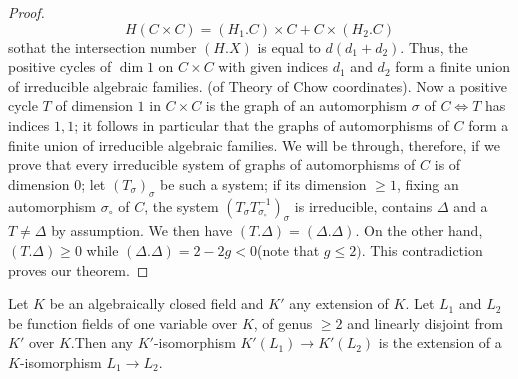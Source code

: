 \begin{proof}
  $$
  H(C \times C) = (H_1.C)\times C + C \times (H_2.C)
  $$
  so\pageoriginale that the intersection number $(H.X)$ is equal to $d(d_1 +
  d_2)$. Thus, the positive cycles of $\dim 1$  on $C \times C$ with
  given indices $d_1$ and $d_2$ form a finite union of irreducible
  algebraic families. (of Theory of  Chow coordinates). Now a positive
  cycle $T$ of dimension $1$ in $C \times C$ is the graph of an automorphism
  $\sigma$ of $C \Leftrightarrow T$ has indices $1,1$; it follows in
  particular that the graphs of automorphisms of $C$ form a finite
  union of irreducible algebraic families. We will be through,
  therefore, if we prove that every irreducible system of graphs of
  automorphisms of $C$ is of dimension $0$; let $(T_ \sigma)_\sigma$
  be such a system; if its dimension $\geq 1$, fixing an automorphism
  $\sigma_\circ$ of $C$, the system $(T_\sigma
  T_{\sigma_\circ}^{-1})_\sigma$ is irreducible, contains $\Delta$ and
  a $T \ne \Delta$ by assumption. We then have $(T.\Delta ) = (\Delta
  . \Delta)$. On the other hand, $(T. \Delta ) \ge 0 $ while $(\Delta
  . \Delta)= 2 - 2g < 0 $(note that $g \le 2)$. This contradiction
  proves our theorem. 
\end{proof}

\begin{coro*}%
  Let $K$ be an algebraically closed field and $K'$ any extension of
  $K$. Let $L_1$ and $L_2$ be function fields of one variable over
  $K$, of genus $\ge 2$ and linearly disjoint from $K'$ over $K$.Then
  any $K'$-isomorphism $K'(L_1)\rightarrow K'(L_2)$ is the extension
  of a $K$-isomorphism $L_1 \rightarrow L_2$. 
\end{coro*}

